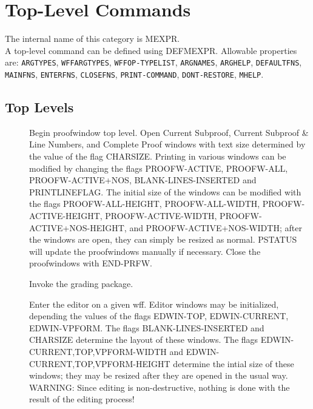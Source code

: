 \chapter{Top-Level Commands}
The internal name of this category is 
MEXPR.\\
A top-level command can be defined using DEFMEXPR.
Allowable properties are: \texttt{ARGTYPES}, \texttt{WFFARGTYPES}, \texttt{WFFOP-TYPELIST}, \texttt{ARGNAMES}, \texttt{ARGHELP}, \texttt{DEFAULTFNS}, \texttt{MAINFNS}, \texttt{ENTERFNS}, \texttt{CLOSEFNS}, \texttt{PRINT-COMMAND}, \texttt{DONT-RESTORE}, \texttt{MHELP}.

\section{Top Levels}

\begin{description} 
\item[\parbox{\textwidth}{BEGIN-PRFW}]  
Begin proofwindow top level.
Open Current Subproof, Current Subproof \&  Line Numbers, and Complete Proof
windows with text size determined by the value of the flag CHARSIZE.
Printing in various windows can be modified by changing the flags
PROOFW-ACTIVE, PROOFW-ALL, PROOFW-ACTIVE+NOS, BLANK-LINES-INSERTED 
and PRINTLINEFLAG.
The initial size of the windows can be modified with the flags
PROOFW-ALL-HEIGHT, PROOFW-ALL-WIDTH, PROOFW-ACTIVE-HEIGHT,
PROOFW-ACTIVE-WIDTH, PROOFW-ACTIVE+NOS-HEIGHT, and 
PROOFW-ACTIVE+NOS-WIDTH; after the windows are open, they can simply 
be resized as normal. PSTATUS will update the proofwindows manually
if necessary. 
Close the proofwindows with END-PRFW.

\item[\parbox{\textwidth}{DO-GRADES}]  
Invoke the grading package.

\item[\parbox{\textwidth}{ED \textit{edwff}}]  
Enter the editor on a given wff.
Editor windows may be initialized, depending the values of the flags 
EDWIN-TOP, EDWIN-CURRENT, EDWIN-VPFORM. The flags BLANK-LINES-INSERTED and 
CHARSIZE determine the layout of these windows. The flags 
EDWIN-{CURRENT,TOP,VPFORM}-WIDTH and EDWIN-{CURRENT,TOP,VPFORM}-HEIGHT 
determine the intial size of these windows; they may be resized after they are
opened in the usual way.
WARNING: Since editing is non-destructive, nothing is done with the result
of the editing process!


\end{description}
